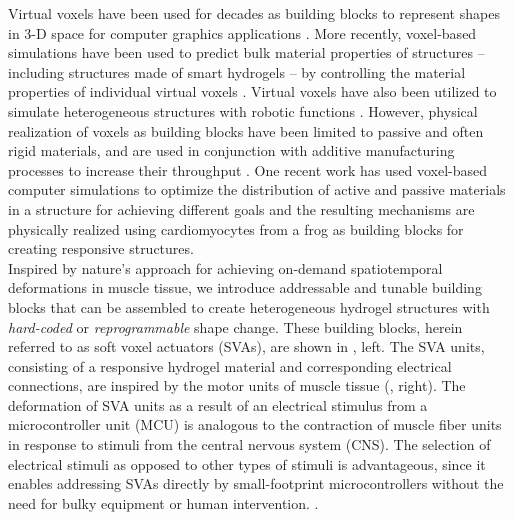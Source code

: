 Virtual voxels have been used for decades as building blocks to represent shapes in 3-D space for computer graphics applications .
More recently, voxel-based simulations have been used to predict bulk material properties of structures -- including structures made of smart hydrogels -- by controlling the material properties of individual virtual voxels . Virtual voxels have also been utilized to simulate heterogeneous structures with robotic functions . 
However, physical realization of voxels as building blocks have been limited to passive and often rigid materials, and are used in conjunction with additive manufacturing processes to increase their throughput . One recent work has used voxel-based computer simulations to optimize the distribution of active and passive materials in a structure for achieving different goals and the resulting mechanisms are physically realized using cardiomyocytes from a frog as building blocks for creating responsive structures.\\

Inspired by nature's approach for achieving on-demand spatiotemporal deformations in muscle tissue, we introduce addressable and tunable building blocks that can be assembled to create heterogeneous hydrogel structures with \textit{hard-coded} or \textit{reprogrammable} shape change. These building blocks, herein referred to as soft voxel actuators (SVAs), are shown in , left. The SVA units, consisting of a responsive hydrogel material and corresponding electrical connections, are inspired by the motor units of muscle tissue (, right).
The deformation of SVA units as a result of an electrical stimulus from a microcontroller unit (MCU) is analogous to the contraction of muscle fiber units in response to stimuli from the central nervous system (CNS).
The selection of electrical stimuli as opposed to other types of stimuli is advantageous, since it enables addressing SVAs directly by small-footprint microcontrollers without the need for bulky equipment or human intervention. .\\





